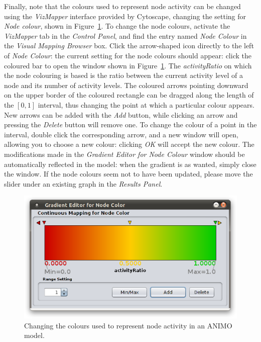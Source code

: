 Finally, note that the colours used to represent node activity can be changed using the \emph{VizMapper}
interface provided by Cytoscape, changing the setting for \emph{Node colour}, shown in Figure~\ref{fig:change-gradient}.
To change the node colours, activate the \emph{VizMapper\texttrademark} tab in the \emph{Control Panel}, and
find the entry named \emph{Node Colour} in the \emph{Visual Mapping Browser} box. Click the arrow-shaped
icon directly to the left of \emph{Node Colour}: the current setting for the node colours should appear:
click the coloured bar to open the window shown in Figure~\ref{fig:change-gradient}.
The \emph{activityRatio} on which the node colouring is based is the ratio between the current activity level
of a node and its number of activity levels.
The coloured arrows pointing downward on the upper border of the coloured rectangle can be dragged along the length of the $[0, 1]$
interval, thus changing the point at which a particular colour appears. New arrows can be added with the \emph{Add} button, while
clicking an arrow and pressing the \emph{Delete} button will remove one. To change the colour of a point in the interval,
double click the corresponding arrow, and a new window will open, allowing you to choose a new colour: clicking \emph{OK} will
accept the new colour. The modifications made in the \emph{Gradient Editor for Node Colour} window should be automatically reflected in
the model: when the gradient is as wanted, simply close the window. If the node colours seem not to have been updated, please move the
slider under an existing graph in the \emph{Results Panel}.

\begin{figure}[!tpb]
\begin{minipage}{\textwidth}
\centering
  \includegraphics[width=.6\textwidth]{images/editing-gradient2}
  \caption{Changing the colours used to represent node activity in an ANIMO model.}\label{fig:change-gradient}
\end{minipage}
\end{figure}


